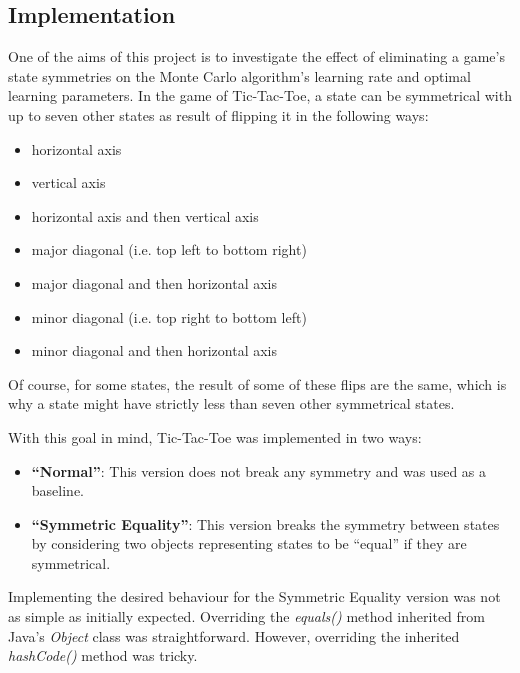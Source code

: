 \documentclass[11pt,a4paper]{report}
\begin{document}
\subsection{Implementation}
\label{sec:TicTacToeImplementation}

One of the aims of this project is to investigate the effect of eliminating a game's state symmetries on the Monte Carlo algorithm's learning rate and optimal learning parameters. In the game of Tic-Tac-Toe, a state can be symmetrical with up to seven other states as result of flipping it in the following ways:

\begin{itemize}
	\item horizontal axis
	\item vertical axis
	\item horizontal axis and then vertical axis
	\item major diagonal (i.e. top left to bottom right)
	\item major diagonal and then horizontal axis
	\item minor diagonal (i.e. top right to bottom left)
	\item minor diagonal and then horizontal axis
\end{itemize}

Of course, for some states, the result of some of these flips are the same, which is why a state might have strictly less than seven other symmetrical states.

With this goal in mind, Tic-Tac-Toe was implemented in two ways:

\begin{itemize}

	\item \textbf{``Normal''}:
This version does not break any symmetry and was used as a baseline.

	\item \textbf{``Symmetric Equality''}: 
This version breaks the symmetry between states by considering two objects representing states to be ``equal'' if they are symmetrical.

\end{itemize}

Implementing the desired behaviour for the Symmetric Equality version was not as simple as initially expected. Overriding the \emph{equals()} method inherited from Java's \emph{Object} class was straightforward. However, overriding the inherited \emph{hashCode()} method was tricky.
\end{document}
